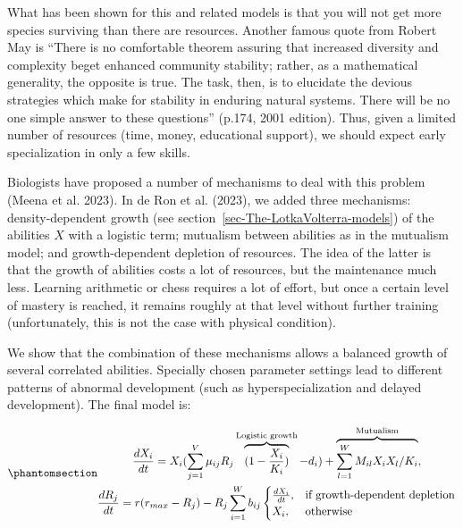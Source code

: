 \documentclass[
  a4paper,
  DIV=11,
  numbers=noendperiod,
  oneside]{scrreprt}
\begin{document}
What has been shown for this and related models is that you will not get
more species surviving than there are resources. Another famous quote
from Robert May is ``There is no comfortable theorem assuring that
increased diversity and complexity beget enhanced community stability;
rather, as a mathematical generality, the opposite is true. The task,
then, is to elucidate the devious strategies which make for stability in
enduring natural systems. There will be no one simple answer to these
questions'' (p.174, 2001 edition). Thus, given a limited number of
resources (time, money, educational support), we should expect early
specialization in only a few skills.

Biologists have proposed a number of mechanisms to deal with this
problem (Meena et al. 2023). In de Ron et al. (2023), we added three
mechanisms: density-dependent growth (see
section~\ref{sec-The-LotkaVolterra-models}) of the abilities \(X\) with
a logistic term; mutualism between abilities as in the mutualism model;
and growth-dependent depletion of resources. The idea of the latter is
that the growth of abilities costs a lot of resources, but the
maintenance much less. Learning arithmetic or chess requires a lot of
effort, but once a certain level of mastery is reached, it remains
roughly at that level without further training (unfortunately, this is
not the case with physical condition).

We show that the combination of these mechanisms allows a balanced
growth of several correlated abilities. Specially chosen parameter
settings lead to different patterns of abnormal development (such as
hyperspecialization and delayed development). The final model is:

\begin{equation}\phantomsection\label{eq-ch6-3-old-44}{
\begin{gathered}
\frac{dX_{i}}{dt} = X_{i} (\sum_{j=1}^{V} \mu_{ij} R_j \overbrace{(1- \frac{X_i}{K_i})}^{\text{Logistic growth}} -  d_i) + \overbrace{ \sum_{l=1}^{W} M_{il} X_{i} X_{l} / K_{i} }^{\text{Mutualism}}, \\
\frac{dR_{j}}{dt} = r(r_{max}-R_j)- R_j \sum_{i=1}^{W} b_{ij} \begin{cases} \frac{dX_{i}}{dt}, & \text{if growth-dependent depletion} \\  X_{i}, & \text{otherwise} \end{cases} 
\end{gathered}
}\end{equation}
\end{document}

